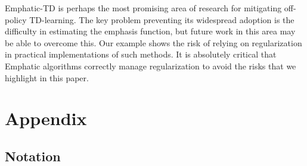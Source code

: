 Emphatic-TD is perhaps the most promising area of research for mitigating off-policy TD-learning. The key problem preventing its widespread adoption is the difficulty in estimating the emphasis function, but future work in this area may be able to overcome this. Our example shows the risk of relying on regularization in practical implementations of such methods. It is absolutely critical that Emphatic algorithms correctly manage regularization to avoid the risks that we highlight in this paper.

\vfill{}
\section{Appendix}

\subsection{Notation}

